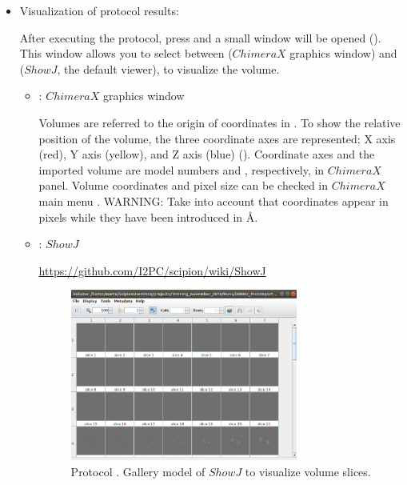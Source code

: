\begin{itemize}
  \item Visualization of protocol results:
  
  After executing the protocol, press  and a small window will be opened (). This window allows you to select between  ($ChimeraX$ graphics window) and  ($ShowJ$, the default \scipion viewer), to visualize the volume.
   
   \begin{itemize}
   \item {}: $ChimeraX$ graphics window
   
   Volumes are referred to the origin of coordinates in \chimera. To show the relative position of the volume, the three coordinate axes are represented; X axis (red), Y axis (yellow), and Z axis (blue) (). Coordinate axes and the imported volume are model numbers  and , respectively, in $ChimeraX$  panel. Volume coordinates and pixel size can be checked in $ChimeraX$ main menu . WARNING: Take into account that coordinates appear in pixels while they have been introduced in \AA.
   
  \item {}: $ShowJ$
   
\url{https://github.com/I2PC/scipion/wiki/ShowJ}


   \begin{figure}[H]
   \centering 
    \captionsetup{width=.7\linewidth} 
    \includegraphics[width=0.75\textwidth]{Images_appendix/Fig103.pdf}
    \caption{Protocol . Gallery model of $ShowJ$ to visualize volume slices.}
    \label{fig:app_protocol_volume_4}
   \end{figure}
   

\end{itemize}
\end{itemize}
